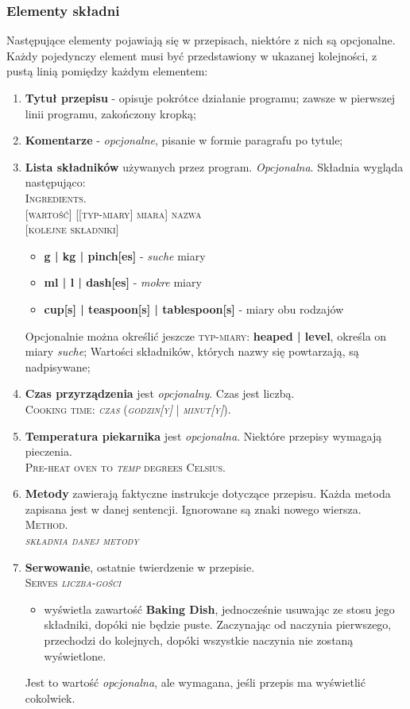 \documentclass[fleqn,10pt]{SelfArx} %
\begin{document}
\subsubsection{Elementy składni}
Następujące elementy pojawiają się w przepisach, niektóre z nich są opcjonalne. Każdy pojedynczy element musi być przedstawiony w ukazanej kolejności, z pustą linią pomiędzy każdym elementem:
\begin{enumerate}
	\item \textbf{Tytuł przepisu} - opisuje pokrótce działanie programu; zawsze w pierwszej linii programu, zakończony kropką;
	\item \textbf{Komentarze} - \textit{opcjonalne}, pisanie w formie paragrafu po tytule;
	\item \textbf{Lista składników} używanych przez program. \textit{Opcjonalna}. Składnia wygląda następująco:\\
		\textsc{Ingredients.} \\
		\textsc{[wartość] [[typ-miary] miara] nazwa}\\
		\textsc{[kolejne składniki]}
	\begin{itemize}
		\item \textbf{g | kg | pinch[es]} - \textit{suche} miary
		\item \textbf{ml | l | dash[es]} - \textit{mokre} miary
		\item \textbf{cup[s] | teaspoon[s] | tablespoon[s]} - miary obu rodzajów
	\end{itemize}
	Opcjonalnie można określić jeszcze \textsc{typ-miary}: \textbf{heaped | level}, określa on miary \textit{suche};
	Wartości składników, których nazwy się powtarzają, są nadpisywane;
	\item \textbf{Czas przyrządzenia} jest \textit{opcjonalny}. Czas jest liczbą.\\
	\textsc{Cooking time: \textit{czas} (\textit{godzin[y]} | \textit{minut[y]}).}
	\item \textbf{Temperatura piekarnika} jest \textit{opcjonalna}. Niektóre przepisy wymagają pieczenia.\\
	\textsc{Pre-heat oven to \textit{temp} degrees Celsius.}
	\item \textbf{Metody} zawierają faktyczne instrukcje dotyczące przepisu. Każda metoda zapisana jest w danej sentencji. Ignorowane są znaki nowego wiersza.\\
	\textsc{Method.}\\
	\textsc{\textit{składnia danej metody}}
	\item \textbf{Serwowanie}, ostatnie twierdzenie w przepisie.\\
	\textsc{Serves \textit{liczba-gości}}
	\begin{itemize}
		\item wyświetla zawartość \textbf{Baking Dish}, jednocześnie usuwając ze stosu jego składniki, dopóki nie będzie puste. Zaczynając od naczynia pierwszego, przechodzi do kolejnych, dopóki wszystkie naczynia nie zostaną wyświetlone.
	\end{itemize}
	Jest to wartość \textit{opcjonalna}, ale wymagana, jeśli przepis ma wyświetlić cokolwiek.
\end{enumerate}
\end{document}
